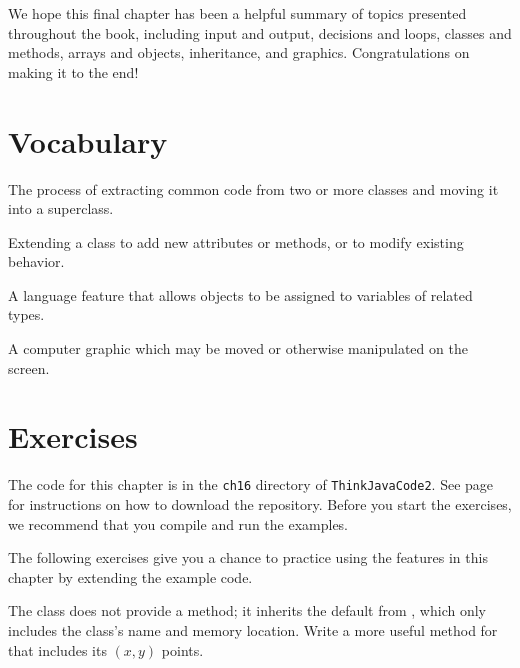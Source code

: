 We hope this final chapter has been a helpful summary of topics presented throughout the book, including input and output, decisions and loops, classes and methods, arrays and objects, inheritance, and graphics.
Congratulations on making it to the end!


\section{Vocabulary}

\begin{description}

The process of extracting common code from two or more classes and moving it into a superclass.

Extending a class to add new attributes or methods, or to modify existing behavior.

A language feature that allows objects to be assigned to variables of related types.

A computer graphic which may be moved or otherwise manipulated on the screen.

\end{description}


\section{Exercises}


The code for this chapter is in the {\tt ch16} directory of {\tt ThinkJavaCode2}.
See page~\pageref{code} for instructions on how to download the repository.
Before you start the exercises, we recommend that you compile and run the examples.

The following exercises give you a chance to practice using the features in this chapter by extending the example code.


\begin{exercise}
The  class does not provide a  method; it inherits the default  from , which only includes the class's name and memory location.
Write a more useful  method for  that includes its $(x, y)$ points.
\end{exercise}


